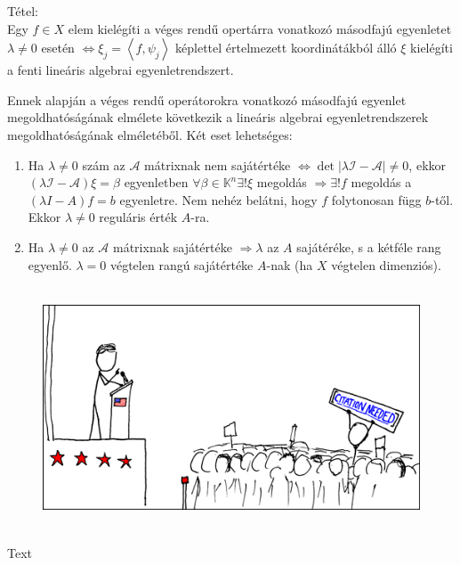 \documentclass[12pt,a4paper]{scrartcl}
\providecommand{\tightlist}{%
  \setlength{\itemsep}{0pt}\setlength{\parskip}{0pt}}
\newenvironment{tetel}{}{}
\newenvironment{ajanlofig}{\begin{figure}\begin{center}}{
\end{center}\end{figure}}
\begin{document}
\begin{tetel}

Tétel:\\
Egy \(f \in X\) elem kielégíti a véges rendű opertárra vonatkozó
másodfajú egyenletet \(\lambda \neq 0\) esetén
\(\left. \Leftrightarrow\xi_{j} = \left\langle {f,\psi_{j}} \right\rangle \right.\)
képlettel értelmezett koordinátákból álló \(\xi\) kielégíti a fenti
lineáris algebrai egyenletrendszert.

\end{tetel}

Ennek alapján a véges rendű operátorokra vonatkozó másodfajú egyenlet
megoldhatóságának elmélete következik a lineáris algebrai
egyenletrendszerek megoldhatóságának elméletéből. Két eset lehetséges:

\begin{enumerate}
\def\labelenumi{\arabic{enumi}.}
\tightlist
\item
  Ha \(\lambda \neq 0\) szám az \(\mathcal{A}\) mátrixnak nem
  sajátértéke
  \(\left. \Leftrightarrow\det\left| {\lambda\mathcal{I} - \mathcal{A}} \right| \neq 0 \right.\),
  ekkor \(\left( {\lambda\mathcal{I} - \mathcal{A}} \right)\xi = \beta\)
  egyenletben \(\forall\beta \in {\mathbb{K}}^{n}\exists!\xi\) megoldás
  \(\left. \Rightarrow\exists!f \right.\) megoldás a
  \(\left( {\lambda I - A} \right)f = b\) egyenletre. Nem nehéz belátni,
  hogy \(f\) folytonosan függ \(b\)-től. Ekkor \(\lambda \neq 0\)
  reguláris érték \(A\)-ra.
\item
  Ha \(\lambda \neq 0\) az \(\mathcal{A}\) mátrixnak sajátértéke
  \(\left. \Rightarrow\lambda \right.\) az \(A\) sajátéréke, s a kétféle
  rang egyenlő. \(\lambda = 0\) végtelen rangú sajátértéke \(A\)-nak (ha
  \(X\) végtelen dimenziós).
\end{enumerate}

\begin{ajanlo}

\begin{ajanlofig}

\href{https://xkcd.com}{\includegraphics[width=5.20833in,height=2.82292in]{wikipedian_protester.png}}

\end{ajanlofig}

Text

\end{ajanlo}
\end{document}
